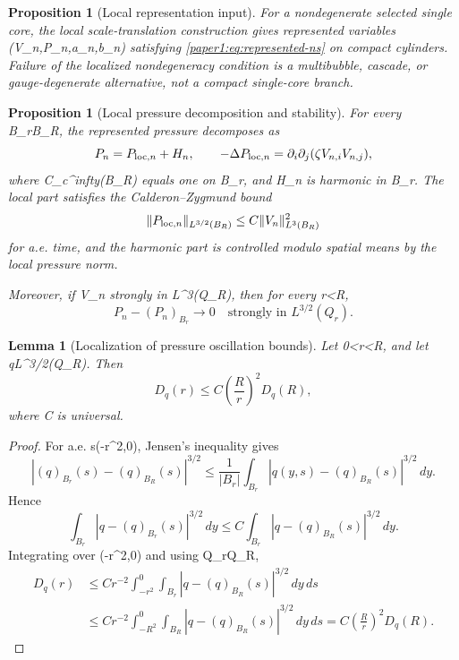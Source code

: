 \documentclass[11pt]{amsart}
\def\({}%
\def\){}%
\def\infty{infty}%
\theoremstyle{plain}
\newtheorem{lemma}[theorem]{Lemma}
\newtheorem{proposition}[theorem]{Proposition}
\theoremstyle{definition}
\theoremstyle{remark}
\begin{document}
\begin{proposition}[Local representation input]\label{paper1:prop:representation-input}
For a nondegenerate selected single core, the local scale-translation
construction gives represented variables \((V_n,P_n,a_n,b_n)\) satisfying
\eqref{paper1:eq:represented-ns} on compact cylinders.  Failure of the localized
nondegeneracy condition is a multibubble, cascade, or gauge-degenerate
alternative, not a compact single-core branch.
\end{proposition}

\begin{proposition}[Local pressure decomposition and stability]
\label{paper1:prop:pressure-reconstruction}
For every \(B_r\Subset B_R\), the represented pressure decomposes as
\[
  P_n=P_{{\rm loc},n}+H_n,
  \qquad
  -\Delta P_{{\rm loc},n}=\partial_i\partial_j(\zeta V_{n,i}V_{n,j}),
\]
where \(\zeta\in C_c^\infty(B_R)\) equals one on \(B_r\), and \(H_n\) is
harmonic in \(B_r\).  The local part satisfies the Calderon--Zygmund bound
\cite{CalderonZygmund1952,Stein1970}
\[
  \|P_{{\rm loc},n}\|_{L^{3/2}(B_R)}
  \le C\|V_n\|_{L^3(B_R)}^2
\]
for a.e. time, and the harmonic part is controlled modulo spatial means by the
local pressure norm.

Moreover, if \(V_n\) strongly in \(L^3(Q_R)\), then for every \(r<R\),
\[
  P_n-(P_n)_{B_r}\to0
  \quad\text{strongly in }L^{3/2}(Q_r).
\]
\end{proposition}

\begin{lemma}[Localization of pressure oscillation bounds]\label{paper1:lem:D-localization}
Let \(0<r<R\), and let \(q\in L^{3/2}(Q_R)\).  Then
\[
  D_q(r)\le C\left(\frac{R}{r}\right)^2D_q(R),
\]
where \(C\) is universal.
\end{lemma}

\begin{proof}
For a.e. \(s\in(-r^2,0)\), Jensen's inequality gives
\[
  |(q)_{B_r}(s)-(q)_{B_R}(s)|^{3/2}
  \le \frac1{|B_r|}\int_{B_r}|q(y,s)-(q)_{B_R}(s)|^{3/2}\,dy .
\]
Hence
\[
  \int_{B_r}|q-(q)_{B_r}(s)|^{3/2}\,dy
  \le
  C\int_{B_r}|q-(q)_{B_R}(s)|^{3/2}\,dy .
\]
Integrating over \((-r^2,0)\) and using \(Q_r\subset Q_R\),
\[
\begin{aligned}
  D_q(r)
  &\le
  Cr^{-2}\int_{-r^2}^0\int_{B_r}
  |q-(q)_{B_R}(s)|^{3/2}\,dy\,ds \\
  &\le
  Cr^{-2}\int_{-R^2}^0\int_{B_R}
  |q-(q)_{B_R}(s)|^{3/2}\,dy\,ds
  =
  C\left(\frac{R}{r}\right)^2D_q(R).
\end{aligned}
\]
\end{proof}
\end{document}
